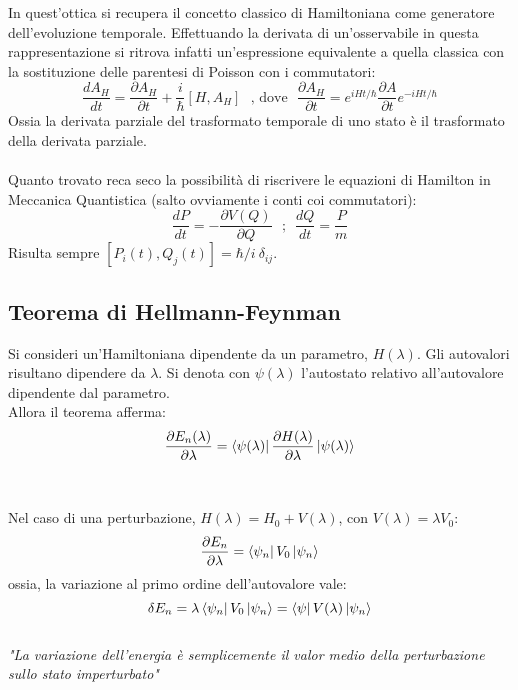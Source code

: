 \documentclass[twoside]{article}
\begin{document}
In quest'ottica si recupera il concetto classico di Hamiltoniana come generatore dell'evoluzione temporale. Effettuando la derivata di un'osservabile in questa rappresentazione si ritrova infatti un'espressione equivalente a quella classica con la sostituzione delle parentesi di Poisson con i commutatori:
\begin{equation} \label{2.4.2}
    \frac{dA_H}{dt}=\frac{\partial A_H}{\partial t} + \frac{i}{\hbar}[H,A_H] \ \ \ \text{, dove} \ \ \ \frac{\partial A_H}{\partial t}=e^{iHt/\hbar}\frac{\partial A}{\partial t}e^{-iHt/\hbar}
\end{equation}
Ossia la derivata parziale del trasformato temporale di uno stato è il trasformato della derivata parziale.
\\
\\
Quanto trovato reca seco la possibilità di riscrivere le equazioni di Hamilton in Meccanica Quantistica (salto ovviamente i conti coi commutatori):
\begin{equation}
    \frac{dP}{dt}=-\frac{\partial V(Q)}{\partial Q} \ \ \ \text{;} \ \ \ \frac{dQ}{dt}=\frac{P}{m}
\end{equation}
Risulta sempre $[P_i (t), Q_j (t)]=\hbar/i \ \delta_{i j}$.

\vspace{0.5cm}

\subsection{Teorema di Hellmann-Feynman}

Si consideri un'Hamiltoniana dipendente da un parametro, $H(\lambda)$. Gli autovalori risultano dipendere da $\lambda$.
Si denota con $\psi(\lambda)$ l'autostato relativo all'autovalore dipendente dal parametro.
\\
Allora il teorema afferma:
\begin{equation} \label{3.0.1}
    \frac{\partial E_n (\lambda)}{\partial \lambda}=\bra{\psi(\lambda)} \frac{\partial H(\lambda)}{\partial \lambda}\ket{\psi(\lambda)}
\end{equation}
\\ \\
Nel caso di una perturbazione, $H(\lambda)=H_0 + V(\lambda)$, con $V(\lambda)=\lambda V_0$:
\begin{equation}
    \frac{\partial E_n}{\partial \lambda}=\bra{\psi_n}V_0\ket{\psi_n}
\end{equation}
ossia, la variazione al primo ordine dell'autovalore vale:
\begin{equation}
    \delta E_n=\lambda \bra{\psi_n}V_0\ket{\psi_n}=\bra{\psi}V(\lambda)\ket{\psi_n}
\end{equation}
\\
\textit{"La variazione dell’energia è semplicemente il valor medio della perturbazione
sullo stato imperturbato"} 
\end{document}
